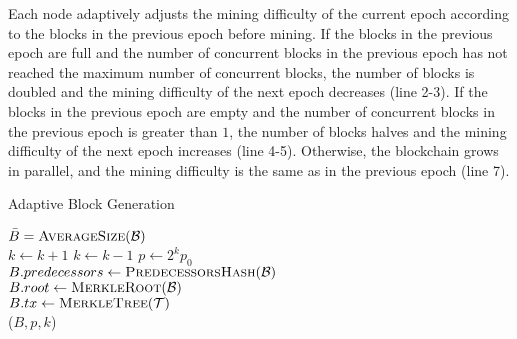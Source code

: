 \documentclass[10pt,journal,compsoc]{IEEEtran}
\renewcommand*\Call[2]{\textproc{#1}(#2)}
\begin{document}
	Each node adaptively adjusts the mining difficulty of the current epoch according to the blocks in the previous epoch before mining. If the blocks in the previous epoch are full and the number of concurrent blocks in the previous epoch has not reached the maximum number of concurrent blocks, the number of blocks is doubled and the mining difficulty of the next epoch decreases (line 2-3). If the blocks in the previous epoch are empty and the number of concurrent blocks in the previous epoch is greater than $1$, the number of blocks halves and the mining difficulty of the next epoch increases (line 4-5). Otherwise, the blockchain grows in parallel, and the mining difficulty is the same as in the previous epoch (line 7).
	
	\begin{algorithm} 
		
		\caption{Adaptive Block Generation} \label{alblockgeneration}
		$\bar{B}=\Call{AverageSize}{\mathcal{B}}$\\
		{     $k \gets k+1$ 
		}
		{    $k \gets k-1$  	
			}
		\Else
		{ 
			$p \gets 2^{k} p_{0}$\\
		}
		$B.predecessors \gets \Call{PredecessorsHash}{\mathcal{B}} $ \\
		$B.root \gets \Call {MerkleRoot}{\mathcal{B}}$\\
		$B.tx \gets \Call {MerkleTree}{\mathcal{T}}$\\
		\Call {Mining }{$B, p,k$} 
	\end{algorithm}        
	
\end{document}
